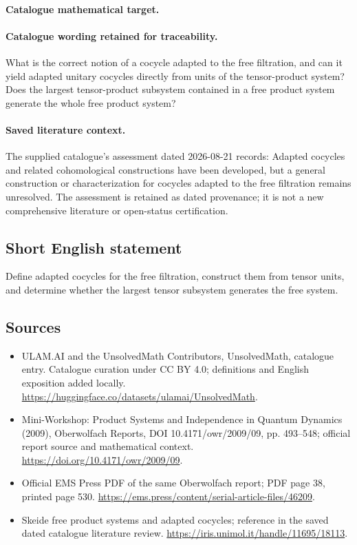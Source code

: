 \documentclass[11pt]{article}
\begin{document}
\paragraph{Catalogue mathematical target.}
\paragraph{Catalogue wording retained for traceability.}
What is the correct notion of a cocycle adapted to the free filtration, and can it yield adapted unitary cocycles directly from units of the tensor-product system? Does the largest tensor-product subsystem contained in a free product system generate the whole free product system?

\paragraph{Saved literature context.} The supplied catalogue's assessment dated 2026-08-21 records: Adapted cocycles and related cohomological constructions have been developed, but a general construction or characterization for cocycles adapted to the free filtration remains unresolved. The assessment is retained as dated provenance; it is not a new comprehensive literature or open-status certification.
\subsection{Short English statement}
Define adapted cocycles for the free filtration, construct them from tensor units, and determine whether the largest tensor subsystem generates the free system.
\subsection{Sources}
\begin{itemize}
\item[\hypertarget{source:statement:1}{S1}] ULAM.AI and the UnsolvedMath Contributors, UnsolvedMath, catalogue entry. Catalogue curation under CC BY 4.0; definitions and English exposition added locally.
\url{https://huggingface.co/datasets/ulamai/UnsolvedMath}.
\item[\hypertarget{source:statement:2}{S2}] Mini-Workshop: Product Systems and Independence in Quantum Dynamics (2009), Oberwolfach Reports, DOI 10.4171/owr/2009/09, pp. 493--548; official report source and mathematical context.
\url{https://doi.org/10.4171/owr/2009/09}.
\item[\hypertarget{source:statement:3}{S3}] Official EMS Press PDF of the same Oberwolfach report; PDF page 38, printed page 530.
\url{https://ems.press/content/serial-article-files/46209}.
\item[\hypertarget{source:statement:4}{S4}] Skeide free product systems and adapted cocycles; reference in the saved dated catalogue literature review.
\url{https://iris.unimol.it/handle/11695/18113}.
\end{itemize}
\label{end:statement}
\end{document}
